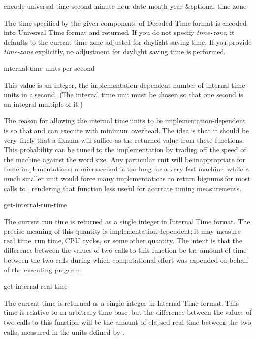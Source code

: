 \begin{defun}[Function]
encode-universal-time second minute hour date month year &optional time-zone

The time specified by the given components of Decoded Time format is
encoded into Universal Time format and returned.  If you do not specify
{\it time-zone}, it defaults to the current time zone adjusted for daylight
saving time.  If you provide {\it time-zone} explicitly, no adjustment for
daylight saving time is performed.
\end{defun}

\begin{defun}[Constant]
internal-time-units-per-second

This value is an integer, the implementation-dependent
number of internal time units in a second.  (The internal time unit must
be chosen so that one second is an integral multiple of it.)

\beforenoterule
\begin{rationale}
The reason for allowing the internal time
units to be implementation-dependent is so that
 and 
can execute with minimum overhead.
The idea is that it should be very likely that a fixnum will suffice as the
returned value from these functions.  This probability can be
tuned to the implementation by trading off the speed of the machine
against the word size.  Any particular unit will
be inappropriate for some implementations: a microsecond is too long
for a very fast machine, while a much smaller unit would
force many implementations to return bignums for most calls
to , rendering that function less useful for accurate
timing measurements.
\end{rationale}
\afternoterule
\end{defun}

\begin{defun}[Function]
get-internal-run-time 

The current run time is returned as a single integer in Internal Time
format.
The precise meaning of this quantity is implementation-dependent;
it may measure real time, run time, CPU cycles, or some other quantity.
The intent is that the difference between the values of two calls
to this function be the amount of time between the two calls
during which computational effort was expended on behalf of the
executing program.
\end{defun}

\begin{defun}[Function]
get-internal-real-time 

The current time is returned as a single integer in Internal Time
format.  This time is relative to an arbitrary time base,
but the difference between the values of two calls
to this function will be the amount of elapsed real time between the two calls,
measured in the units defined by .
\end{defun}

